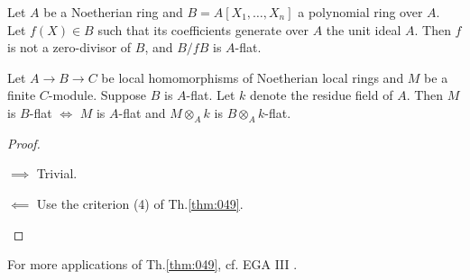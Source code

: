 \documentclass[../main]{subfiles}
\begin{document}
\begin{parcorollary} Let $A$ be a Noetherian ring and $B = A[X_1,\dots,X_n]$ a polynomial ring over $A$. Let $f(X)\in B$ such that its coefficients generate over $A$ the unit ideal $A$. Then $f$ is not a zero-divisor of $B$, and $B/fB$ is $A$-flat.\end{parcorollary}

\begin{parapplication} Let $A\longrightarrow B \longrightarrow C$ be local homomorphisms of Noetherian local rings and $M$ be a finite $C$-module. Suppose $B$ is $A$-flat. Let $k$ denote the residue field of $A$. Then $M$ is $B$-flat $\iff$ $M$ is $A$-flat and $M\otimes_A k$ is $B\otimes_A k$-flat. \end{parapplication}

\begin{proof}\phantom{,}
\begin{implyenumerate}
    \item[$\implies$] Trivial.
    \item[$\impliedby$] Use the criterion (4) of Th.\ref{thm:049}.
\end{implyenumerate}
\end{proof}

For more applications of Th.\ref{thm:049}, cf. EGA III \cite{egaIII}.
\end{document}
